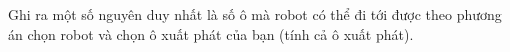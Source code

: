 Ghi ra một số nguyên duy nhất là số ô mà robot có thể đi tới được theo phương án chọn robot và chọn ô xuất phát của bạn (tính cả ô xuất phát).  

\